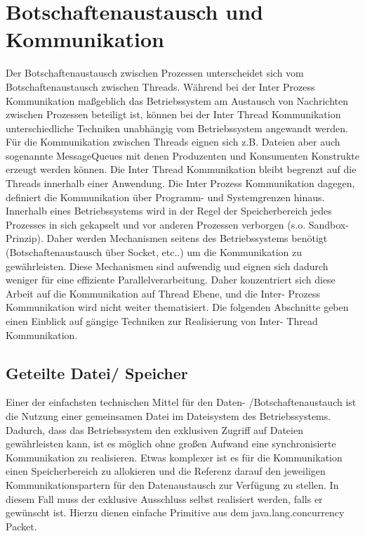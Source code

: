 \documentclass[12pt,oneside,a4paper,bibtotoc,liststotoc]{scrreprt}
\begin{document}
\section{Botschaftenaustausch und Kommunikation}
Der Botschaftenaustausch zwischen Prozessen unterscheidet sich vom Botschaftenaustausch zwischen Threads. Während bei der Inter Prozess Kommunikation maßgeblich das Betriebssystem am Austausch von Nachrichten zwischen Prozessen beteiligt ist, können bei der Inter Thread Kommunikation unterschiedliche Techniken unabhängig vom Betriebssystem angewandt werden. Für die Kommunikation zwischen Threads eignen sich z.B. Dateien aber auch sogenannte MessageQueues mit denen Produzenten und Konsumenten Konstrukte erzeugt werden können. Die Inter Thread Kommunikation bleibt begrenzt auf die Threads innerhalb einer Anwendung. Die Inter Prozess Kommunikation dagegen, definiert die Kommunikation über Programm- und Systemgrenzen hinaus. Innerhalb eines Betriebssystems wird in der Regel der Speicherbereich jedes Prozesses in sich gekapselt und vor anderen Prozessen verborgen (s.o. Sandbox-Prinzip). Daher werden Mechanismen seitens des Betriebssystems benötigt (Botschaftenaustausch über Socket, etc..) um die Kommunikation zu gewährleisten. Diese Mechanismen sind aufwendig und eignen sich dadurch weniger für eine effiziente Parallelverarbeitung. Daher konzentriert sich diese Arbeit auf die Kommunikation auf Thread Ebene, und die Inter- Prozess Kommunikation wird nicht weiter thematisiert. Die folgenden Abschnitte geben einen Einblick auf gängige Techniken zur Realisierung von Inter- Thread Kommunikation.

\subsection{Geteilte Datei/ Speicher}
Einer der einfachsten technischen Mittel für den Daten- /Botschaftenaustauch ist die Nutzung einer gemeinsamen Datei im Dateisystem des Betriebssystems. Dadurch, dass das Betriebssystem den exklusiven Zugriff auf Dateien gewährleisten kann, ist es möglich ohne großen Aufwand eine synchronisierte Kommunikation zu realisieren. Etwas komplexer ist es für die Kommunikation einen Speicherbereich zu allokieren und die Referenz darauf den jeweiligen Kommunikationspartern für den Datenaustausch zur Verfügung zu stellen. In diesem Fall muss der exklusive Ausschluss selbst realisiert werden, falls er gewünscht ist. Hierzu dienen einfache Primitive aus dem java.lang.concurrency Packet.
\end{document}

